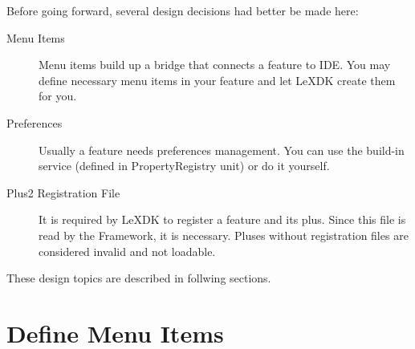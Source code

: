 Before going forward, several design decisions had better be made here:

\begin{description}
  \item[Menu Items] Menu items build up a bridge that connects a feature to 
  IDE. You may define necessary menu items in your feature and let LeXDK create 
  them for you.
  
  \item[Preferences] Usually a feature needs preferences management. You can 
  use the build-in service (defined in PropertyRegistry unit) or do it yourself.
  
  \item[Plus2 Registration File] It is required by LeXDK to register a feature
  and its plus. Since this file is read by the Framework, it is necessary.
  Pluses without registration files are considered invalid and not loadable.
  
\end{description}

These design topics are described in follwing sections.

\section{Define Menu Items}

